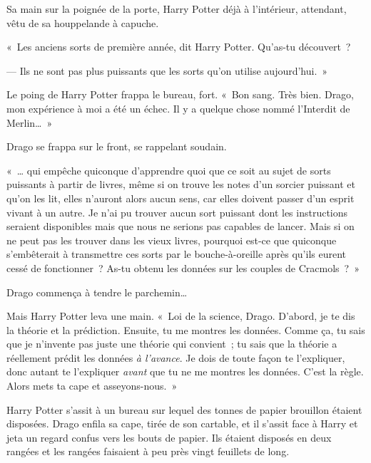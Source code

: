 Sa main sur la poignée de la porte, Harry Potter déjà à l'intérieur, attendant, vêtu de sa houppelande à capuche.

«~Les anciens sorts de première année, dit Harry Potter. Qu'as-tu découvert~?

--- Ils ne sont pas plus puissants que les sorts qu'on utilise aujourd'hui.~»

Le poing de Harry Potter frappa le bureau, fort. «~Bon sang. Très bien. Drago, mon expérience à moi a été un échec. Il y a quelque chose nommé l'Interdit de Merlin…~»

Drago se frappa sur le front, se rappelant soudain.

«~… qui empêche quiconque d'apprendre quoi que ce soit au sujet de sorts puissants à partir de livres, même si on trouve les notes d'un sorcier puissant et qu'on les lit, elles n'auront alors aucun sens, car elles doivent passer d'un esprit vivant à un autre. Je n'ai pu trouver aucun sort puissant dont les instructions seraient disponibles mais que nous ne serions pas capables de lancer. Mais si on ne peut pas les trouver dans les vieux livres, pourquoi est-ce que quiconque s'embêterait à transmettre ces sorts par le bouche-à-oreille après qu'ils eurent cessé de fonctionner~? As-tu obtenu les données sur les couples de Cracmols~?~»

Drago commença à tendre le parchemin…

Mais Harry Potter leva une main. «~Loi de la science, Drago. D'abord, je te dis la théorie et la prédiction. Ensuite, tu me montres les données. Comme ça, tu sais que je n'invente pas juste une théorie qui convient~; tu sais que la théorie a réellement prédit les données \emph{à l'avance}. Je dois de toute façon te l'expliquer, donc autant te l'expliquer \emph{avant} que tu ne me montres les données. C'est la règle. Alors mets ta cape et asseyons-nous.~»

Harry Potter s'assit à un bureau sur lequel des tonnes de papier brouillon étaient disposées. Drago enfila sa cape, tirée de son cartable, et il s'assit face à Harry et jeta un regard confus vers les bouts de papier. Ils étaient disposés en deux rangées et les rangées faisaient à peu près vingt feuillets de long.

